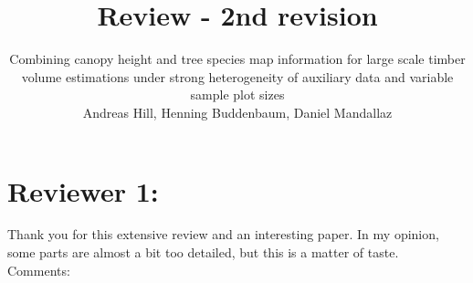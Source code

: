 \documentclass{article}
\title{Review - 2nd revision}
\author{Combining canopy height and tree species map information for large scale timber volume estimations under strong heterogeneity of auxiliary data and variable sample plot sizes\\
Andreas Hill, Henning Buddenbaum, Daniel Mandallaz}
\begin{document}

\maketitle
\thispagestyle{empty}
\newpage

\setcounter{page}{1}

\pagestyle{fancy} %
\fancyfoot[C]{\thepage}
\setlength{\headsep}{15mm}

\newcommand{\answer}[1]{\small \color{mybrown}{#1} \color{black}}
\newcommand{\note}[1]{\textit{\small \color{amaranth} \textbf{Note:} #1} \color{black}}
\newcommand{\todo}[1]{\color{red}{#1} \color{black}}
\newcommand{\answerfin}[1]{\small \color{mygreen}{#1} \color{black}}



\section*{Reviewer 1:}

Thank you for this extensive review and an interesting paper. In my opinion, some parts are almost a bit too detailed, but this is a matter of taste.\\

Comments:\\
\end{document}
